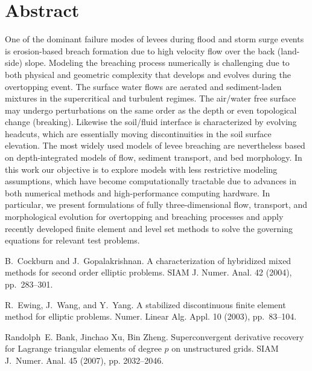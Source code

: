 \section*{Abstract}
One of the dominant failure modes of levees during flood and storm
surge events is erosion-based breach formation due to high velocity
flow over the back (land-side) slope.  Modeling the breaching process
numerically is challenging due to both physical and geometric
complexity that develops and evolves during the overtopping event. The
surface water flows are aerated and sediment-laden mixtures in the
supercritical and turbulent regimes. The air/water free surface may
undergo perturbations on the same order as the depth or even
topological change (breaking). Likewise the soil/fluid interface is
characterized by evolving headcuts, which are essentially moving
discontinuities in the soil surface elevation. The most widely used
models of levee breaching are nevertheless based on depth-integrated
models of flow, sediment transport, and bed morphology. In this work
our objective is to explore models with less restrictive modeling
assumptions, which have become computationally tractable due to
advances in both numerical methods and high-performance computing
hardware. In particular, we present formulations of fully
three-dimensional flow, transport, and morphological evolution for
overtopping and breaching processes and apply recently developed
finite element and level set methods to solve the governing equations
for relevant test problems.



 
 \begin{thebibliography}{10}

 {\sc B.~Cockburn and J.~Gopalakrishnan}. {A characterization of hybridized
   mixed methods for second order elliptic problems}. SIAM J. Numer. Anal. 42
   (2004), pp.~283--301.

 {\sc R.~Ewing, J.~Wang, and Y.~Yang}. {A stabilized discontinuous finite
   element method for elliptic problems}. Numer. Linear Alg. Appl. 10 (2003),
   pp.~83--104.

 {\sc Randolph~E. Bank, Jinchao Xu, Bin Zheng}.
 \newblock Superconvergent derivative recovery for {Lagrange} triangular
   elements of degree $p$ on unstructured grids.
 \newblock SIAM J.~Numer. Anal. 45 (2007), pp. 2032--2046. 

 \end{thebibliography}

